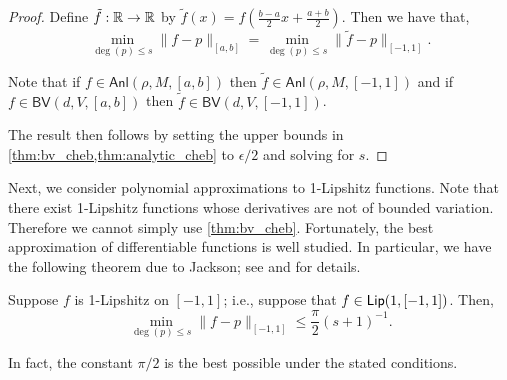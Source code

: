 \begin{proof}
    Define \( \tilde{f} : \mathbb{R}\to\mathbb{R}\) by \( \tilde{f}(x) = f( \frac{b-a}{2} x + \frac{a+b}{2} ) \).
    Then we have that,
    \begin{equation*}
        \min_{\deg(p) \leq s} \| f - p \|_{[a,b]}
        = \min_{\deg(p) \leq s} \| \tilde{f} - p \|_{[-1,1]}.
    \end{equation*}
    
    Note that if \( f\in \mathsf{Anl}(\rho,M,[a,b]) \) then \( \tilde{f} \in \mathsf{Anl}(\rho,M,[-1,1]) \) and if \( f\in \mathsf{BV}(d,V,[a,b]) \) then \( \tilde{f} \in \mathsf{BV}(d,V,[-1,1]) \).

The result then follows by setting the upper bounds in \cref{thm:bv_cheb,thm:analytic_cheb} to \( \epsilon/2 \) and solving for \( s \).
\end{proof}

Next, we consider polynomial approximations to 1-Lipshitz functions.
Note that there exist 1-Lipshitz functions whose derivatives are not of bounded variation. 
Therefore we cannot simply use \cref{thm:bv_cheb}.
Fortunately, the best approximation of differentiable functions is well studied. 
In particular, we have the following theorem due to Jackson; see \cite[Section 87]{achieser_92} and \cite[Section 6]{cheney_00} for details.
\begin{theorem} %
\label{thm:jackson}
    Suppose \( f \) is 1-Lipshitz on \( [-1,1] \); i.e., suppose that \( f \in \textup{\textsf{Lip}}(1,[-1,1]) \).
Then,
\begin{equation*}
    \min_{\deg(p) \leq s} \| f - p \|_{[-1,1]} \leq \frac{\pi}{2} (s+1)^{-1}.
\end{equation*}
\end{theorem}
In fact, the constant \( \pi/2 \) is the best possible under the stated conditions.

